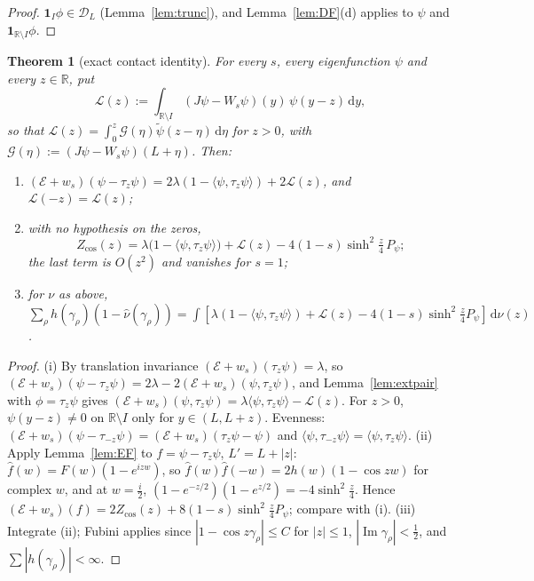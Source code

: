 \documentclass[11pt]{amsart}
\newcommand{\R}{\mathbb{R}}
\newcommand{\cE}{\mathcal{E}}
\newcommand{\cL}{\mathcal{L}}
\newcommand{\one}{\mathbf{1}}
\newcommand{\dd}{\,\mathrm{d}}
\DeclareMathOperator{\im}{Im}
\newtheorem{theorem}{Theorem}[section]
\theoremstyle{definition}
\theoremstyle{remark}
\numberwithin{equation}{section}
\begin{document}
\begin{proof}
$\one_I\phi\in \mathcal D_L$ (Lemma~\ref{lem:trunc}), and Lemma~\ref{lem:DF}(d) applies to $\psi$ and $\one_{\R\setminus I}\phi$.
\end{proof}

\begin{theorem}[exact contact identity]\label{thm:T0}
For every $s$, every eigenfunction $\psi$ and every $z\in\R$, put
\[
\cL(z):=\int_{\R\setminus I}(J\psi-W_s\psi)(y)\,\psi(y-z)\dd y,
\]
so that $\cL(z)=\int_0^z\mathcal G(\eta)\tilde\psi(z-\eta)\dd\eta$ for $z>0$, with $\mathcal G(\eta):=(J\psi-W_s\psi)(L+\eta)$.
Then:
\begin{enumerate}
\item[(i)] $(\cE+w_s)(\psi-\tau_z\psi)=2\lambda(1-\langle\psi,\tau_z\psi\rangle)+2\cL(z)$, and $\cL(-z)=\cL(z)$;
\item[(ii)] with no hypothesis on the zeros,
\[
Z_{\cos}(z)=\lambda\bigl(1-\langle\psi,\tau_z\psi\rangle\bigr)+\cL(z)-4(1-s)\sinh^2\tfrac z4\,P_\psi ;
\]
the last term is $O(z^2)$ and vanishes for $s=1$;
\item[(iii)] for $\nu$ as above, $\sum_\rho h(\gamma_\rho)(1-\hat\nu(\gamma_\rho))=\int[\lambda(1-\langle\psi,\tau_z\psi\rangle)+\cL(z)-4(1-s)\sinh^2\frac z4P_\psi]\dd\nu(z)$.
\end{enumerate}
\end{theorem}

\begin{proof}
(i) By translation invariance $(\cE+w_s)(\tau_z\psi)=\lambda$, so $(\cE+w_s)(\psi-\tau_z\psi)=2\lambda-2(\cE+w_s)(\psi,\tau_z\psi)$, and Lemma~\ref{lem:extpair} with $\phi=\tau_z\psi$ gives $(\cE+w_s)(\psi,\tau_z\psi)=\lambda\langle\psi,\tau_z\psi\rangle-\cL(z)$. For $z>0$, $\psi(y-z)\ne0$ on $\R\setminus I$ only for $y\in(L,L+z)$. Evenness: $(\cE+w_s)(\psi-\tau_{-z}\psi)=(\cE+w_s)(\tau_z\psi-\psi)$ and $\langle\psi,\tau_{-z}\psi\rangle=\langle\psi,\tau_z\psi\rangle$. (ii) Apply Lemma~\ref{lem:EF} to $f=\psi-\tau_z\psi$, $L'=L+|z|$: $\hat f(w)=F(w)(1-e^{izw})$, so $\hat f(w)\hat f(-w)=2h(w)(1-\cos zw)$ for complex $w$, and at $w=\frac i2$, $(1-e^{-z/2})(1-e^{z/2})=-4\sinh^2\frac z4$. Hence $(\cE+w_s)(f)=2Z_{\cos}(z)+8(1-s)\sinh^2\frac z4P_\psi$; compare with (i). (iii) Integrate (ii); Fubini applies since $|1-\cos z\gamma_\rho|\le C$ for $|z|\le1$, $|\im\gamma_\rho|<\frac12$, and $\sum|h(\gamma_\rho)|<\infty$.
\end{proof}
\end{document}
